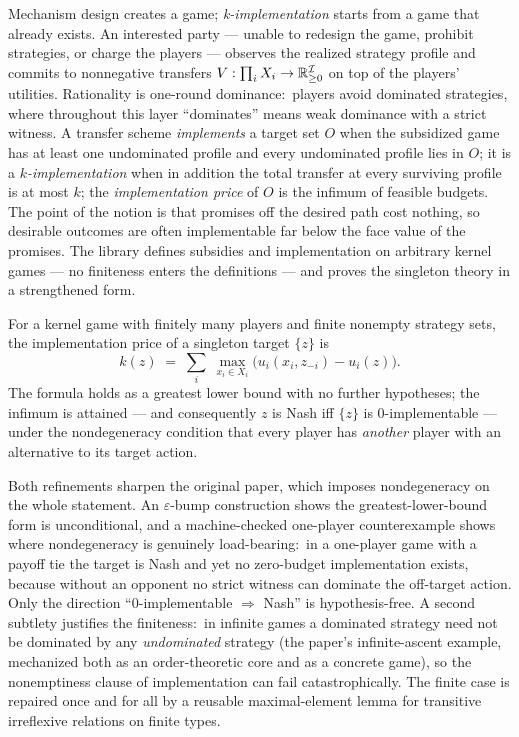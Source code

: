 Mechanism design creates a game; \emph{k-implementation}
\citep{MondererTennenholtz2004} starts from a game that already
exists.  An interested party — unable to redesign the game, prohibit
strategies, or charge the players — observes the realized strategy
profile and commits to nonnegative transfers
$V : \prod_i X_i \to \mathbb{R}_{\ge 0}^{\mathcal{I}}$ on top of the players'
utilities.  Rationality is one-round dominance:\ players avoid
dominated strategies, where throughout this layer ``dominates'' means
weak dominance with a strict witness.  A transfer scheme
\emph{implements} a target set $O$ when the subsidized game has at
least one undominated profile and every undominated profile lies in
$O$; it is a \emph{$k$-implementation} when in addition the total
transfer at every surviving profile is at most $k$; the
\emph{implementation price} of $O$ is the infimum of feasible budgets.
The point of the notion is that promises off the desired path cost
nothing, so desirable outcomes are often implementable far below the
face value of the promises.  The library defines subsidies and
implementation on arbitrary kernel games — no finiteness enters the
definitions — and proves the singleton theory in a strengthened form.

\begin{theorem}
\label{thm:kimpl-singleton}
For a kernel game with finitely many players and finite nonempty
strategy sets, the implementation price of a singleton target
$\{z\}$ is
\[
  k(z) \;=\; \sum_{i}\; \max_{x_i \in X_i}
      \bigl( u_i(x_i, z_{-i}) - u_i(z) \bigr).
\]
The formula holds as a greatest lower bound with no further
hypotheses; the infimum is attained — and consequently $z$ is Nash iff
$\{z\}$ is 0-implementable — under the nondegeneracy condition that
every player has \emph{another} player with an alternative to its
target action.
\end{theorem}

\noindent Both refinements sharpen the original paper, which imposes
nondegeneracy on the whole statement.  An
$\varepsilon$-bump construction shows the greatest-lower-bound form is
unconditional, and a machine-checked one-player counterexample shows
where nondegeneracy is genuinely load-bearing:\ in a one-player game
with a payoff tie the target is Nash and yet no zero-budget
implementation exists, because without an opponent no strict witness
can dominate the off-target action.  Only the direction
``0-implementable $\Rightarrow$ Nash'' is hypothesis-free.  A second
subtlety justifies the finiteness:\ in infinite games a dominated
strategy need not be dominated by any \emph{undominated} strategy
(the paper's infinite-ascent example, mechanized both as an
order-theoretic core and as a concrete game), so the nonemptiness
clause of implementation can fail catastrophically.  The finite case
is repaired once and for all by a reusable maximal-element lemma for
transitive irreflexive relations on finite types.

